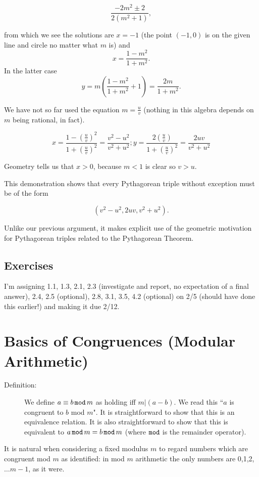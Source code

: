 \documentclass[12pt]{article}
\begin{document}
$$\frac{-2m^2\pm 2}{2(m^2+1)},$$

from which we see the solutions are $x=-1$ (the point $(-1,0)$ is on the given line and circle no matter what $m$ is)
and $$x=\frac{1-m^2}{1+m^2}.$$  In the latter case $$y=m(\frac{1-m^2}{1+m^2}+1)=\frac{2m}{1+m^2}.$$

We have not so far used the equation $m=\frac uv$ (nothing in this algebra depends on $m$ being rational, in fact).

$$x=\frac{1-(\frac uv)^2}{1+(\frac uv)^2}=\frac{v^2-u^2}{v^2+u^2};  y=\frac{2(\frac uv)}{1+(\frac uv)^2}=\frac{2uv}{v^2+u^2}$$

Geometry tells us that $x>0$, because $m<1$ is clear so $v>u$.

This demonstration shows that every Pythagorean triple without exception must be of the form 

$$(v^2-u^2,2uv,v^2+u^2).$$

Unlike our previous argument, it makes explicit use of the geometric motivation for Pythagorean triples related to the Pythagorean Theorem.  

\subsection{Exercises}

I'm assigning 1.1, 1.3, 2.1, 2.3 (investigate and report, no expectation of a final answer), 2.4, 2.5 (optional), 2.8, 3.1, 3.5, 4.2 (optional) on 2/5 (should have done this earlier!)
and making it due 2/12. 

\section{Basics of Congruences (Modular Arithmetic)}

\begin{description}
\item[Definition:]  We define $a \equiv b \,{\tt mod}\,m$ as holding iff $m|(a-b)$.  We read this ``$a$ is congruent to $b$ mod $m$".  It is straightforward to show that this is an equivalence relation.  It is also straightforward to show that this is equivalent to $a \,{\tt mod}\, m = b \,{\tt mod}\, m$ (where ${\tt mod}$ is the remainder operator).
\end{description}

It is natural when considering a fixed modulus $m$ to regard numbers which are congruent mod $m$ as identified:  in mod $m$ arithmetic the only numbers are 0,1,2,$\ldots m-1$, as it were.
\end{document}

